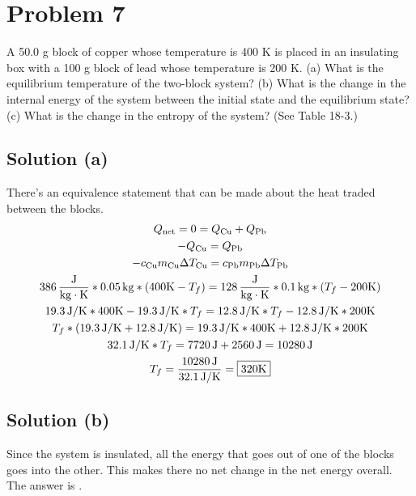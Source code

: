 \documentclass[12pt]{article}
\begin{document}
    \pagebreak
    \section{Problem 7}
        A 50.0 g block of copper whose temperature is 400 K is placed in an insulating box with a 100 g block of lead whose temperature is 200 K. 
        (a) What is the equilibrium temperature of the two-block system? 
        (b) What is the change in the internal energy of the system between the initial state and the equilibrium state? 
        (c) What is the change in the entropy of the system? (See Table 18-3.)

        \subsection{Solution (a)}
            There's an equivalence statement that can be made about the heat traded between the blocks.
            \begin{gather}
                Q_{\rm net} =   0   =   Q_{\rm Cu} + Q_{\rm Pb}\\
                -Q_{\rm Cu}  =   Q_{\rm Pb}\\
                -c_{\rm Cu} m_{\rm Cu} \Delta T_{\rm Cu} = c_{\rm Pb} m_{\rm Pb} \Delta T_{\rm Pb} \\
                386\,\unit{\frac{J}{\kilo\gram\cdot\kelvin}} * 0.05\,\unit{\kilo\gram} * \left( 400\unit{\kelvin} - T_f \right) = 128\,\unit{\frac{J}{\kilo\gram\cdot\kelvin}} * 0.1\,\unit{\kilo\gram} * \left( T_f - 200\unit{\kelvin} \right)\\
                19.3\,\unit{\joule/\kelvin} * 400\unit{\kelvin} - 19.3\,\unit{\joule/\kelvin} * T_f = 12.8\,\unit{\joule/\kelvin} * T_f - 12.8\,\unit{\joule/\kelvin} * 200\unit{\kelvin}\\
                T_f * (19.3\,\unit{\joule/\kelvin} + 12.8\,\unit{\joule/\kelvin}) = 19.3\,\unit{\joule/\kelvin} * 400\unit{\kelvin} + 12.8\,\unit{\joule/\kelvin} * 200\unit{\kelvin}\\
                32.1\,\unit{\joule/\kelvin} * T_f = 7720\,\unit{\joule} + 2560\,\unit{\joule}
                    =   10280\,\unit{\joule}\\
                T_f =   \frac{10280\,\unit{\joule}}{32.1\,\unit{\joule/\kelvin}}
                    =   \boxed{320\unit{\kelvin}}
            \end{gather}

        \subsection{Solution (b)}
            Since the system is insulated, all the energy that goes out of one of the blocks goes into the other. 
            This makes there no net change in the net energy overall.
            The answer is .
\end{document}
